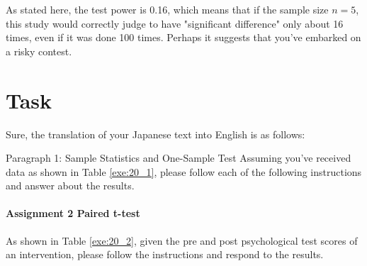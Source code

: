 \documentclass{ltjsbook}
\begin{document}



As stated here, the test power is 0.16, which means that if the sample size $n = 5$, this study would correctly judge to have "significant difference" only about 16 times, even if it was done 100 times. Perhaps it suggests that you've embarked on a risky contest.
\section{Task}
Sure, the translation of your Japanese text into English is as follows:

Paragraph 1: Sample Statistics and One-Sample Test
Assuming you've received data as shown in Table \ref{exe:20_1}, please follow each of the following instructions and answer about the results.



\paragraph{Assignment 2 Paired t-test}
As shown in Table \ref{exe:20_2}, given the pre and post psychological test scores of an intervention, please follow the instructions and respond to the results.



\end{document}
